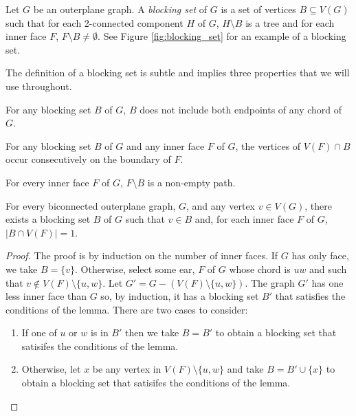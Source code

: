 \documentclass{patmorin}
\begin{document}
Let $G$ be an outerplane graph. A \emph{blocking set} of $G$ is a set
of vertices $B \subseteq V(G)$ such that for each 2-connected component
$H$ of $G$, $H \setminus B$ is a tree and for each inner face $F$,
$F \setminus B \not= \emptyset$.  See Figure \ref{fig:blocking_set}
for an example of a blocking set.

The definition of a blocking set is subtle and implies three properties
that we will use throughout.   

\begin{obs}
   For any blocking set $B$ of $G$, $B$ does not include both endpoints
   of any chord of $G$.
\end{obs}

\begin{obs}
   For any blocking set $B$ of $G$ and any inner face $F$ of $G$, the
   vertices of $V(F)\cap B$ occur consecutively on the boundary of $F$.
\end{obs}

\begin{obs}
  For every inner face $F$ of $G$, $F \setminus B$ is a non-empty path.
\end{obs}


\begin{lem}
  For every biconnected outerplane graph, $G$, and any vertex $v\in
  V(G)$, there exists a blocking set $B$ of $G$ such that $v\in B$ and,
  for each inner face $F$ of $G$, $|B\cap V(F)|=1$.
\end{lem}

\begin{proof}
  The proof is by induction on the number of inner faces.  If $G$ has
  only face, we take $B=\{v\}$.  Otherwise, select some ear, $F$ of $G$
  whose chord is $uw$ and such that $v\not\in V(F)\setminus\{u,w\}$.
  Let $G'=G-(V(F)\setminus\{u,w\})$.  The graph $G'$ has one less inner
  face than $G$ so, by induction, it has a blocking set $B'$ that satisfies
  the conditions of the lemma.  There are two cases to consider:
  \begin{enumerate}
    \item If one of $u$ or $w$ is in $B'$ then we take $B=B'$ to obtain
      a blocking set that satisifes the conditions of the lemma.

    \item Otherwise, let $x$ be any vertex in $V(F)\setminus\{u,w\}$ and
      take $B=B'\cup\{x\}$ to obtain a blocking set that satisifes the
      conditions of the lemma. \qedhere
  \end{enumerate}
\end{proof}
\end{document}
